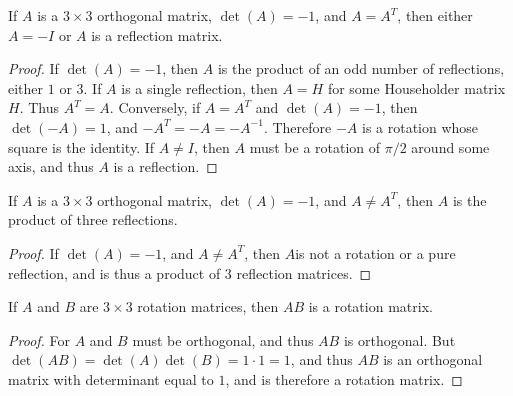 \documentclass[crop=false,class=book,oneside]{standalone}
\begin{document}
        \begin{theorem}
        If $A$ is a $3\times 3$ orthogonal matrix, $\det(A) = -1$, and $A=A^T$, then either $A=-I$ or $A$ is a reflection matrix.
        \end{theorem}
        \begin{proof}
        If $\det(A)=-1$, then $A$ is the product of an odd number of reflections, either $1$ or $3$. If $A$ is a single reflection, then $A=H$ for some Householder matrix $H$. Thus $A^T = A$. Conversely, if $A = A^T$ and $\det(A) = -1$, then $\det(-A) = 1$, and $-A^T = -A = -A^{-1}$. Therefore $-A$ is a rotation whose square is the identity. If $A\ne I$, then $A$ must be a rotation of $\pi/2$ around some axis, and thus $A$ is a reflection.
        \end{proof}
        \begin{theorem}
        If $A$ is a $3\times 3$ orthogonal matrix, $\det(A) = -1$, and $A\ne A^T$, then $A$ is the product of three reflections.
        \end{theorem}
        \begin{proof}
        If $\det(A) = -1$, and $A\ne A^T$, then $A$is not a rotation or a pure reflection, and is thus a product of $3$ reflection matrices.
        \end{proof}
        \begin{theorem}
        If $A$ and $B$ are $3\times 3$ rotation matrices, then $AB$ is a rotation matrix.
        \end{theorem}
        \begin{proof}
        For $A$ and $B$ must be orthogonal, and thus $AB$ is orthogonal. But $\det(AB) = \det(A)\det(B) = 1\cdot 1 = 1$, and thus $AB$ is an orthogonal matrix with determinant equal to $1$, and is therefore a rotation matrix.
        \end{proof}
\end{document}
